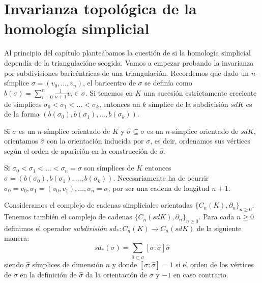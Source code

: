 \documentclass[HS.tex]{subfiles}
\begin{document}
\section{Invarianza topológica de la homología simplicial}

Al principio del capítulo planteábamos la cuestión de si la homología simplicial dependía de la triangulacióne scogida. Vamos a empezar probando la invarianza por subdivisiones baricéntricas de una triangulación. Recordemos que dado un $n$-símplice $\sigma=(v_0,\dots, v_n)$, el baricentro de $\sigma$ se definía como $b(\sigma)=\sum_{i=0}^n\frac{1}{n+1}v_i\in\mathring{\sigma}$. Si tenemos en $K$ una sucesión estrictamente creciente de símplices $\sigma_0<\sigma_1<\dots <\sigma_k$, entonces un $k$ símplice de la subdivisión $sdK$ es de la forma $(b(\sigma_0),b(\sigma_1),\dots, b(\sigma_k))$. 

Si $\sigma$ es un $n$-símplice orientado de $K$ y $\hat{\sigma}\subseteq\sigma$ es un $n$-símplice orientado de $sdK$, orientamos $\hat{\sigma}$ con la orientación inducida por $\sigma$, es dcir, ordenamos sus vértices según el orden de aparición en la construcción de $\hat{\sigma
}$. 

Si $\sigma_0<\sigma_1<\dots<\sigma_n=\sigma$ son símplices de $K$ entonces $\hat{\sigma}=(b(\sigma_0),b(\sigma_1),\dots, b(\sigma_k))$. Necesariamente ha de ocurrir $\sigma_0=v_0, \sigma_1=(v_0,v_1), \dots, \sigma_n=\sigma$, por ser una cadena de longitud $n+1$. 


Consideramos el complejo de cadenas simpliciales orientadas $\{C_n(K),\partial_n\}_{n\geq 0}$. Tenemos también el complejo de cadenas $\{C_n(sdK),\partial_n\}_{n\geq 0}$. Para cada $n\geq 0$ definimos el operador \emph{subdivisión} $sd_*:C_n(K)\to C_n(sdK)$ de la siguiente manera:
\[
sd_*(\sigma)=\sum_{\hat{\sigma}\subset\sigma}[\sigma:\hat{\sigma}]\hat{\sigma}
\]
siendo $\hat{\sigma}$ símplices de dimensión $n$ y donde $[\sigma:\hat{\sigma}]=1$ si el orden de los vértices de $\sigma$ en la definición de $\hat{\sigma}$ da la orientación de $\sigma$ y $-1$ en caso contrario. 
\end{document}
